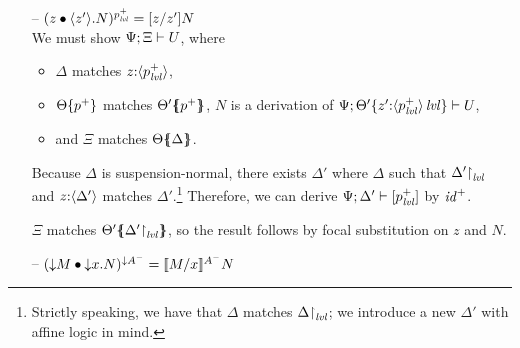\begin{itemize}
\item[--] $(\subst{z}{\tetap{z'}{N}})^{p^+_{\mlvl}} = [z/z']N$\smallskip\\
  We must show $\foc{\Psi}{\Xi}{U}$, where 
  \begin{itemize}
   \item $\Delta$ matches $z{:}\susp{p^+_\mlvl}$,
   \item $\tackon{\Theta}{p^+}$ matches $\frameoff{\Theta'}{p^+}$,
      $N$ is a derivation of 
      $\foc{\Psi}{\tackon{\Theta'}{z'{:}\islvl{\susp{p^+_\mlvl}}}}{U}$,
   \item and $\Xi$ matches $\frameoff{\Theta}{\Delta}$.
  \end{itemize}
  Because $\Delta$ is suspension-normal, there exists $\Delta'$ where
  $\Delta$ such that $\restrictto{\Delta'}{\mlvl}$ and
  $z{:}\susp{\Delta'}$ matches $\Delta'$.\footnote{Strictly
    speaking, we have that $\Delta$ matches
    $\restrictto{\Delta}{\mlvl}$; we introduce a new $\Delta'$ with
    affine logic in mind.} Therefore, we can derive
  $\foc{\Psi}{\Delta'}{[p^+_\mlvl]}$ by ${\it id}^+$.

  $\Xi$ matches
  $\frameoff{\Theta'}{\restrictto{\Delta'}{\mlvl}}$,
  so the result follows by focal substitution on $z$ and $N$. 

\smallskip
 
\item[--] $(\subst{\tdownr{M}}{\tdownl{x}{N}})^{{\downarrow}A^-} 
           = \rsubsta{M}{x}{N}{A^-}$ %




\end{itemize}
